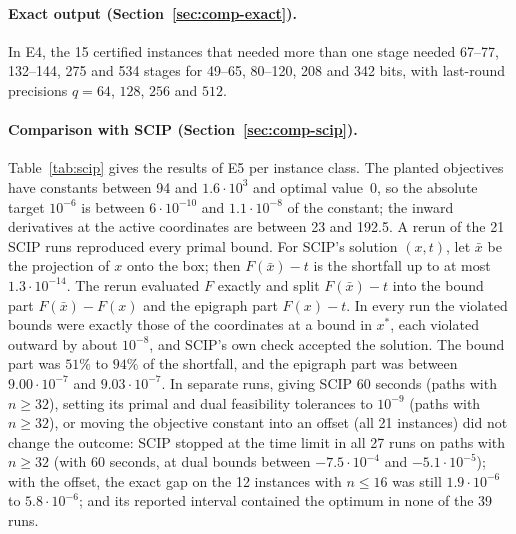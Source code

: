 \paragraph{Exact output (Section~\ref{sec:comp-exact}).}
In E4, the 15 certified instances that needed more than one stage needed
67--77, 132--144, 275 and 534 stages for 49--65, 80--120, 208 and 342 bits,
with last-round precisions $q=64$, $128$, $256$ and $512$.

\paragraph{Comparison with SCIP (Section~\ref{sec:comp-scip}).}
Table~\ref{tab:scip} gives the results of E5 per instance class. The planted
objectives have constants between 94 and $1.6\cdot10^3$ and optimal value~$0$,
so the absolute target $10^{-6}$ is between $6\cdot10^{-10}$ and
$1.1\cdot10^{-8}$ of the constant; the inward derivatives at the active
coordinates are between 23 and 192.5. A rerun of the 21 SCIP runs reproduced
every primal bound. For SCIP's solution $(x,t)$, let $\bar x$ be the
projection of $x$ onto the box; then $F(\bar x)-t$ is the shortfall up to at
most $1.3\cdot10^{-14}$. The rerun evaluated $F$ exactly and split
$F(\bar x)-t$ into the bound part $F(\bar x)-F(x)$ and the epigraph part
$F(x)-t$. In every run the violated bounds were exactly those of the
coordinates at a bound in $x^*$, each violated outward by about $10^{-8}$, and
SCIP's own check accepted the solution. The bound part was $51\%$ to $94\%$ of
the shortfall, and the epigraph part was between $9.00\cdot10^{-7}$ and
$9.03\cdot10^{-7}$. In separate runs, giving SCIP 60
seconds (paths with $n\ge32$), setting its primal and dual feasibility
tolerances to $10^{-9}$ (paths with $n\ge32$), or moving the objective
constant into an offset (all 21 instances) did not change the outcome: SCIP
stopped at the time limit in all 27 runs on paths with $n\ge32$ (with 60
seconds, at dual bounds between $-7.5\cdot10^{-4}$ and $-5.1\cdot10^{-5}$);
with the offset, the exact gap on the 12 instances with $n\le16$ was still
$1.9\cdot10^{-6}$ to $5.8\cdot10^{-6}$; and its reported interval contained
the optimum in none of the 39 runs.

